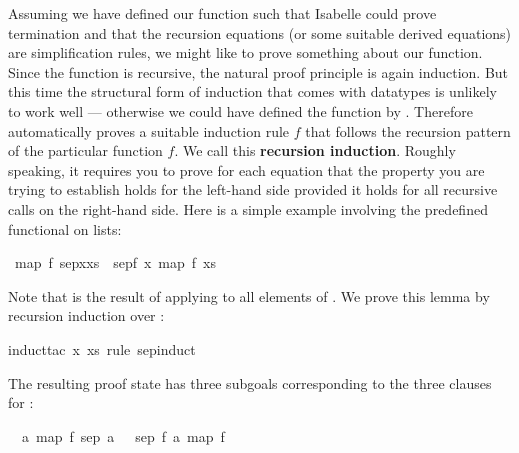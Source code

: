 %
\begin{isabellebody}%
\def\isabellecontext{Induction}%
%
\isadelimtheory
%
\endisadelimtheory
%
\isatagtheory
%
\endisatagtheory
{\isafoldtheory}%
%
\isadelimtheory
%
\endisadelimtheory
\isamarkuptrue%
%
\begin{isamarkuptext}%
Assuming we have defined our function such that Isabelle could prove
termination and that the recursion equations (or some suitable derived
equations) are simplification rules, we might like to prove something about
our function. Since the function is recursive, the natural proof principle is
again induction. But this time the structural form of induction that comes
with datatypes is unlikely to work well --- otherwise we could have defined the
function by . Therefore  automatically
proves a suitable induction rule $f$ that follows the
recursion pattern of the particular function $f$. We call this
\textbf{recursion induction}. Roughly speaking, it
requires you to prove for each  equation that the property
you are trying to establish holds for the left-hand side provided it holds
for all recursive calls on the right-hand side. Here is a simple example
involving the predefined  functional on lists:%
\end{isamarkuptext}%
\isamarkupfalse%
\ {\isachardoublequote}map\ f\ {\isacharparenleft}sep{\isacharparenleft}x{\isacharcomma}xs{\isacharparenright}{\isacharparenright}\ {\isacharequal}\ sep{\isacharparenleft}f\ x{\isacharcomma}\ map\ f\ xs{\isacharparenright}{\isachardoublequote}%
\isadelimproof
%
\endisadelimproof
%
\isatagproof
\isamarkuptrue%
%
\begin{isamarkuptxt}%
\noindent
Note that 
is the result of applying  to all elements of . We prove
this lemma by recursion induction over :%
\end{isamarkuptxt}%
\isamarkupfalse%
induct{\isacharunderscore}tac\ x\ xs\ rule{\isacharcolon}\ sep{\isachardot}induct{\isacharparenright}\isamarkuptrue%
%
\begin{isamarkuptxt}%
\noindent
The resulting proof state has three subgoals corresponding to the three
clauses for :
\begin{isabelle}%
\ {}{\isachardot}\ {\isasymAnd}a{\isachardot}\ map\ f\ {\isacharparenleft}sep\ {\isacharparenleft}a{\isacharcomma}\ {\isacharbrackleft}{\isacharbrackright}{\isacharparenright}{\isacharparenright}\ {\isacharequal}\ sep\ {\isacharparenleft}f\ a{\isacharcomma}\ map\ f\ {\isacharbrackleft}{\isacharbrackright}{\isacharparenright}\isanewline

\end{isabelle}
\end{isamarkuptxt}
\end{isabellebody}
